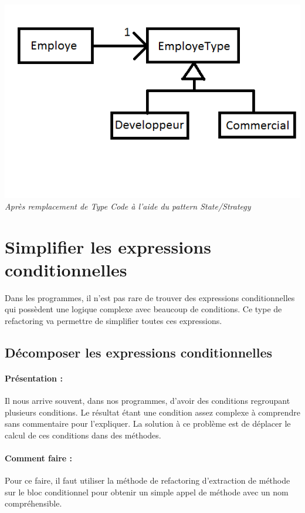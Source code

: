 \documentclass[a4paper,twoside,12pt,openright]{report}
\begin{document}
\begin{center}
\includegraphics[scale=1]{Image/TypeCode_State.png}\\
\itshape{Après remplacement de Type Code à l'aide du pattern State/Strategy}
\end{center}


\newpage
\section{Simplifier les expressions conditionnelles}
Dans les programmes, il n'est pas rare de trouver des expressions conditionnelles qui possèdent une logique complexe avec beaucoup de conditions. Ce type de refactoring va permettre de simplifier toutes ces expressions.\\



\subsection{Décomposer les expressions conditionnelles}
\paragraph{Présentation :}
Il nous arrive souvent, dans nos programmes, d'avoir des conditions regroupant plusieurs conditions. Le résultat étant une condition assez complexe à comprendre sans commentaire pour l'expliquer. La solution à ce problème est de déplacer le calcul de ces conditions dans des méthodes.

\paragraph{Comment faire :}
Pour ce faire, il faut utiliser la méthode de refactoring d'extraction de méthode sur le bloc conditionnel pour obtenir un simple appel de méthode avec un nom compréhensible.
\end{document}

